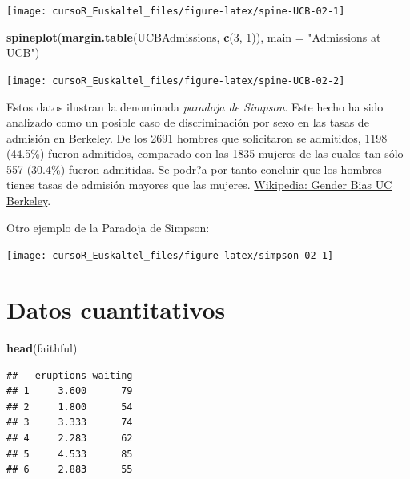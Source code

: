 \documentclass[]{book}
\newenvironment{Shaded}{\begin{snugshade}}{\end{snugshade}}
\newcommand{\KeywordTok}[1]{\textcolor[rgb]{0.13,0.29,0.53}{\textbf{#1}}}
\newcommand{\DataTypeTok}[1]{\textcolor[rgb]{0.13,0.29,0.53}{#1}}
\newcommand{\DecValTok}[1]{\textcolor[rgb]{0.00,0.00,0.81}{#1}}
\newcommand{\StringTok}[1]{\textcolor[rgb]{0.31,0.60,0.02}{#1}}
\newcommand{\NormalTok}[1]{#1}
\begin{document}
\begin{center}\texttt{[image: cursoR\_Euskaltel\_files/figure-latex/spine-UCB-02-1]} \end{center}

\begin{Shaded}
\begin{Highlighting}[]
\KeywordTok{spineplot}\NormalTok{(}\KeywordTok{margin.table}\NormalTok{(UCBAdmissions, }\KeywordTok{c}\NormalTok{(}\DecValTok{3}\NormalTok{, }\DecValTok{1}\NormalTok{)),}
           \DataTypeTok{main =} \StringTok{"Admissions at UCB"}\NormalTok{)}
\end{Highlighting}
\end{Shaded}

\begin{center}\texttt{[image: cursoR\_Euskaltel\_files/figure-latex/spine-UCB-02-2]} \end{center}

Estos datos ilustran la denominada \emph{paradoja de Simpson}. Este
hecho ha sido analizado como un posible caso de discriminación por sexo
en las tasas de admisión en Berkeley. De los 2691 hombres que
solicitaron se admitidos, 1198 (44.5\%) fueron admitidos, comparado con
las 1835 mujeres de las cuales tan sólo 557 (30.4\%) fueron admitidas.
Se podr?a por tanto concluir que los hombres tienes tasas de admisión
mayores que las mujeres.
\href{https://en.wikipedia.org/wiki/Simpson\%27s_paradox\#UC_Berkeley_gender_bias}{Wikipedia:
Gender Bias UC Berkeley}.

Otro ejemplo de la Paradoja de Simpson:

\begin{center}\texttt{[image: cursoR\_Euskaltel\_files/figure-latex/simpson-02-1]} \end{center}

\section{Datos cuantitativos}\label{datos-cuantitativos}

\begin{Shaded}
\begin{Highlighting}[]
\KeywordTok{head}\NormalTok{(faithful)}
\end{Highlighting}
\end{Shaded}

\begin{verbatim}
##   eruptions waiting
## 1     3.600      79
## 2     1.800      54
## 3     3.333      74
## 4     2.283      62
## 5     4.533      85
## 6     2.883      55
\end{verbatim}
\end{document}
